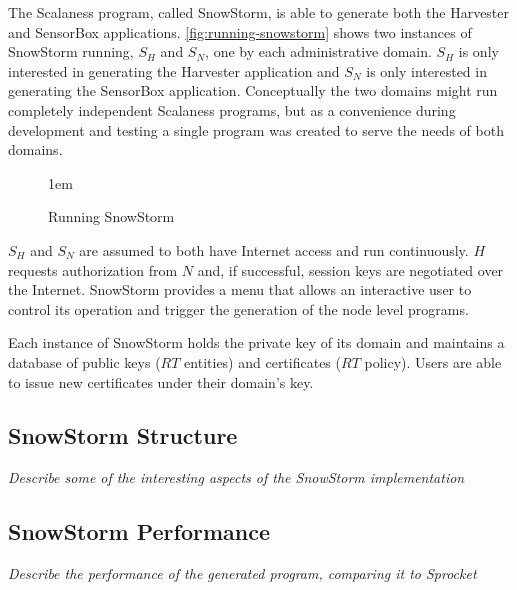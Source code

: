 The Scalaness program, called SnowStorm, is able to generate both the Harvester and SensorBox
applications. \autoref{fig:running-snowstorm} shows two instances of SnowStorm running, $S_H$
and $S_N$, one by each administrative domain. $S_H$ is only interested in generating the
Harvester application and $S_N$ is only interested in generating the SensorBox application.
Conceptually the two domains might run completely independent Scalaness programs, but as a
convenience during development and testing a single program was created to serve the needs of
both domains.

\begin{figure}[htbp]
  
  \centerline{\raise 1em\box\graph}
  \caption{Running SnowStorm}
  \label{fig:running-snowstorm}
\end{figure}

$S_H$ and $S_N$ are assumed to both have Internet access and run continuously. $H$ requests
authorization from $N$ and, if successful, session keys are negotiated over the Internet.
SnowStorm provides a menu that allows an interactive user to control its operation and trigger
the generation of the node level programs.

Each instance of SnowStorm holds the private key of its domain and maintains a database of
public keys ($RT$ entities) and certificates ($RT$ policy). Users are able to issue new
certificates under their domain's key.

\subsection{SnowStorm Structure}

\textit{Describe some of the interesting aspects of the SnowStorm implementation}

\subsection{SnowStorm Performance}

\textit{Describe the performance of the generated program, comparing it to Sprocket}


